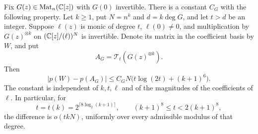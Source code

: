 \begin{lemma}
\label{lem:boundary-comparison}
Fix $G(z)\in\operatorname{Mat}_n(\mathbb C[z])$ with $G(0)$ invertible.  There is a constant
$C_G$ with the following property.  Let $k\geq1$, put $N=n^k$ and
$d=k\deg G$, and let $t>d$ be an integer.  Suppose $\ell(z)$ is monic of
degree $t$, $\ell(0)\ne0$, and multiplication by $G(z)^{\otimes k}$ on
$(\mathbb C[z]/(\ell))^N$ is invertible.  Denote its matrix in the coefficient
basis by $W$, and put
\[
 A_G=\mathcal T_t(G(z)^{\otimes k}).
\]
Then
\begin{equation}
 \bigl|p(W)-p(A_G)\bigr|
 \leq C_G N\bigl(t\log(2t)+(k+1)^6\bigr).
 \label{feedback:eq:boundary-error}
\end{equation}
The constant is independent of $k,t,\ell$ and of the magnitudes of the
coefficients of $\ell$.  In particular, for
\begin{equation}
 t=t(k)=2^{\lceil 8\log_2(k+1)\rceil},
 \qquad (k+1)^8\leq t<2(k+1)^8,
 \label{feedback:eq:common-length}
\end{equation}
the difference is $o(tkN)$, uniformly over every admissible modulus of
that degree.
\end{lemma}

